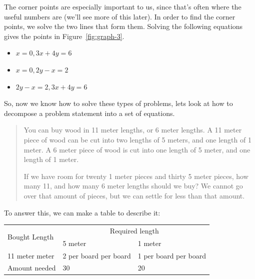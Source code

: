 The corner points are especially important to us, since that's often where the
useful numbers are (we'll see more of this later). In order to find the corner
points, we solve the two lines that form them. Solving the following equations
gives the points in Figure~\ref{fig:graph-3}.

\begin{mymulticols}
  \begin{itemize}
    \item $x = 0, 3x + 4y = 6$
    \item $x = 0, 2y - x = 2$
    \item $2y - x = 2, 3x + 4y = 6$
  \end{itemize}
\end{mymulticols}

So, now we know how to solve these types of problems, lets look at how to
decompose a problem statement into a set of equations.

\begin{quote}

  You can buy wood in 11 meter lengths, or 6 meter lengths. A 11 meter piece of
  wood can be cut into two lengths of 5 meters, and one length of 1 meter. A 6
  meter piece of wood is cut into one length of 5 meter, and one length of 1
  meter.

  If we have room for twenty 1 meter pieces and thirty 5 meter pieces, how many
  11, and how many 6 meter lengths should we buy? We cannot go over that amount
  of pieces, but we can settle for less than that amount.

\end{quote}

To answer this, we can make a table to describe it:

\begin{center}
  \begin{tabular} {|p{3cm}|p{2cm}|p{2cm}|}
    \hline
    \multirow{2}{*}{Bought Length} & \multicolumn{2}{c|}{Required length}\\
    \cline{2-3}
    & 5 meter & 1 meter\\ \hline
    11 meter\newline 6 meter & 2 per board\newline 1 per board & 1 per
    board\newline 1 per board\\ \hline
    Amount needed & 30 & 20\\ \hline
  \end{tabular}
\end{center}

